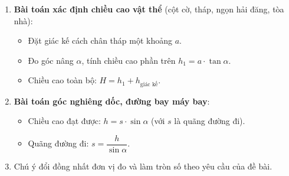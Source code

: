\begin{enumerate}
\item \textbf{Bài toán xác định chiều cao vật thể} (cột cờ, tháp, ngọn hải đăng, tòa nhà):
\begin{itemize}
\item Đặt giác kế cách chân tháp một khoảng $a$.
\item Đo góc nâng $\alpha$, tính chiều cao phần trên $h_1 = a \cdot \tan \alpha$.
\item Chiều cao toàn bộ: $H = h_1 + h_{\text{giác kế}}$.
\end{itemize}
\item \textbf{Bài toán góc nghiêng dốc, đường bay máy bay}:
\begin{itemize}
\item Chiều cao đạt được: $h = s \cdot \sin \alpha$ (với $s$ là quãng đường đi).
\item Quãng đường đi: $s = \dfrac{h}{\sin \alpha}$.
\end{itemize}
\item Chú ý đổi đồng nhất đơn vị đo và làm tròn số theo yêu cầu của đề bài.
\end{enumerate}
